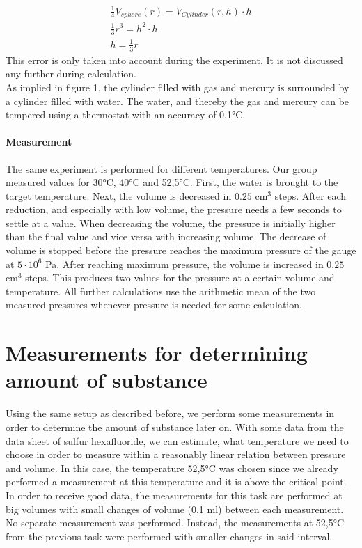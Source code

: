 \documentclass[10pt,a4paper]{article}
\begin{document}
\begin{align}
\frac{1}{4}V_{sphere}(r) = V_{Cylinder}(r,h) \cdot h\\
\frac{1}{3} r^3 = h^2 \cdot h\\
h = \frac{1}{3}r
\end{align}
This error is only taken into account during the experiment. It is not discussed any further during calculation.\\
As implied in figure 1, the cylinder filled with gas and mercury is surrounded by a cylinder filled with water. The water, and thereby the gas and mercury can be tempered using a thermostat with an accuracy of 0.1°C.

\paragraph{Measurement}

The same experiment is performed for different temperatures. Our group measured values for 30°C, 40°C and 52,5°C.
First, the water is brought to the target temperature. Next, the volume is decreased in $0.25$ cm$^3$ steps. After each reduction, and especially with low volume, the pressure needs a few seconds to settle at a value. When decreasing the volume, the pressure is initially higher than the final value and vice versa with increasing volume. The decrease of volume is stopped before the pressure reaches the maximum pressure of the gauge at $5\cdot10^6$ Pa. After reaching maximum pressure, the volume is increased in $0.25$ cm$^3$ steps. This produces two values for the pressure at a certain volume and temperature. All further calculations use the arithmetic mean of the two measured pressures whenever pressure is needed for some calculation.


\section{Measurements for determining amount of substance}

Using the same setup as described before, we perform some measurements in order to determine the amount of substance later on. With some data from the data sheet \cite{messerDataSheet} of sulfur hexafluoride, we can estimate, what temperature we need to choose in order to measure within a reasonably linear relation between pressure and volume. In this case, the temperature 52,5°C was chosen since we already performed a measurement at this temperature and it is above the critical point. In order to receive good data, the measurements for this task are performed at big volumes with small changes of volume (0,1 ml) between each measurement.\\
No separate measurement was performed. Instead, the measurements at 52,5°C from the previous task were performed with smaller changes in said interval.
\end{document}
